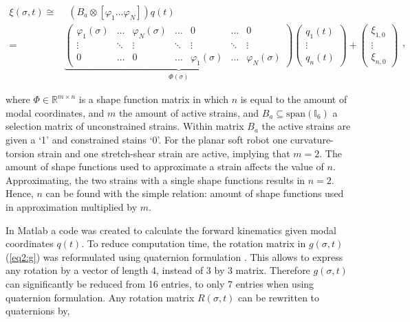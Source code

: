 \begin{equation}
\begin{aligned}
    \xi(\sigma,t) \cong & \hspace{5pt}  (B_a \otimes [ \varphi_1 \dots \varphi_N ])q(t)\\ = &  \underbrace{ \begin{pmatrix}
    \varphi_1(\sigma) & \dots  & \varphi_N(\sigma) & \dots     & 0      & \dots  &  0 \\
    \vdots    & \ddots & \vdots    & \ddots    & \vdots & \ddots & \vdots \\
    0         & \dots  & 0         & \dots     & \varphi_1(\sigma) & \dots & \varphi_N (\sigma)
    \end{pmatrix}}_{\Phi(\sigma)} \begin{pmatrix} q_1(t) \\ \vdots \\ q_n(t) \end{pmatrix} +  \begin{pmatrix} \xi_{1,0} \\ \vdots \\ \xi_{n,0}   \end{pmatrix}
    \end{aligned},
\label{eq2:xishape}
\end{equation}

where $\Phi \in \mathbb{R}^{m \times n}$ is a shape function matrix in which $n$ is equal to the amount of modal coordinates, and $m$ the amount of active strains, and $B_a \subseteq \text{span}(\mathbb{I}_6)$ a selection matrix of unconstrained strains. Within matrix $B_a$ the active strains are given a `1' and constrained stains `0'. For the planar soft robot one curvature-torsion strain and one stretch-shear strain are active, implying that $m = 2$. The amount of shape functions used to approximate a strain affects the value of $n$. Approximating, the two strains with a single shape functions results in $n = 2$. Hence, $n$ can be found with the simple relation: amount of shape functions used in approximation multiplied by $m$.


In Matlab \cite{MATLAB2020} a code was created to calculate the forward kinematics given modal coordinates $q(t)$. To reduce computation time, the rotation matrix in $g(\sigma,t)$ (\ref{eq2:g}) was reformulated using quaternion formulation \cite{Boyer2019}. This allows to express any rotation by a vector of length 4, instead of 3 by 3 matrix. Therefore $g(\sigma,t)$ can significantly be reduced from 16 entries, to only 7 entries when using quaternion formulation. Any rotation matrix $R(\sigma,t)$ can be rewritten to quaternions by,


